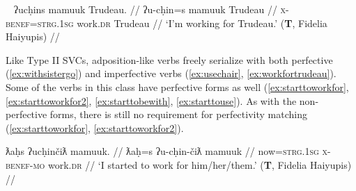 \ex~ \label{ex:workfortrudeau}
\begingl
\glpreamble ʔucḥins mamuuk Trudeau. //
\gla ʔu-cḥin=s mamuuk Trudeau //
\glb \textsc{x}-\textsc{benef}=\textsc{strg.1sg} work.\textsc{dr} Trudeau //
\glft `I'm working for Trudeau.' (\textbf{T}, Fidelia Haiyupis) //
\endgl
\xe

\begin{comment}
\ex \label{ex:goingwithfriend}
\begingl
\glpreamble ʔucačiʔaƛukʷitaḥ t̓an̓eʔis c̓uumaʕas ʔukʷink yaaqsčaʕinʔitq. //
\gla ʔu-ca-čiƛ=!aƛ=uk=(m)it=(m)aˑḥ t̓an̓a=ʔis c̓uumaʕas ʔu-(č)ink yaq-L.(k)sčaʕin=ʔiˑtq //
\glb \textsc{x}-go-\textsc{mo}=\textsc{now}=\textsc{poss}=\textsc{pst}=\textsc{real.1sg} child=\textsc{dim} Port.Alberni \textsc{x}-with who-friendly=\textsc{defn.3} //
\glft `My child went to Port Alberni with his friend.' (\textbf{B}, Bob Mundy) //
\endgl
\xe

\ex~ \label{ex:*goingwithfriend}
\begingl
\glpreamble *ʔukʷink̓aƛukʷitaḥ ʔucačiƛ t̓an̓eʔis yaaqsčaʕinʔitq. //
\gla ʔu-(č)ink=!aƛ=uk=(m)it=(m)aˑḥ ʔu-ca-čiƛ t̓an̓a=ʔis yaq-L.(k)sčaʕin=ʔiˑtq //
\glb \textsc{x}-with=\textsc{now}=\textsc{poss}=\textsc{pst}=\textsc{real.1sg} \textsc{x}-go-\textsc{mo} child=\textsc{dim} who-friendly=\textsc{defn.3} //
\glft Intended: `My child went with his friend.' (\textbf{B}, Bob Mundy) //
\endgl
\xe
\end{comment}



Like Type II SVCs, adposition-like verbs freely serialize with both perfective (\ref{ex:withsistergo}) and imperfective verbs (\ref{ex:usechair}, \ref{ex:workfortrudeau}). Some of the verbs in this class have perfective forms as well (\ref{ex:starttoworkfor}, \ref{ex:starttoworkfor2}, \ref{ex:starttobewith}, \ref{ex:starttouse}). As with the non-perfective forms, there is still no requirement for perfectivity matching (\ref{ex:starttoworkfor}, \ref{ex:starttoworkfor2}).

\ex \label{ex:starttoworkfor}
\begingl
\glpreamble ƛaḥs ʔucḥinčiƛ mamuuk. //
\gla ƛaḥ=s ʔu-cḥin-čiƛ mamuuk //
\glb now=\textsc{strg.1sg} \textsc{x}-\textsc{benef}-\textsc{mo} work.\textsc{dr} //
\glft `I started to work for him/her/them.' (\textbf{T}, Fidelia Haiyupis) //
\endgl
\xe

